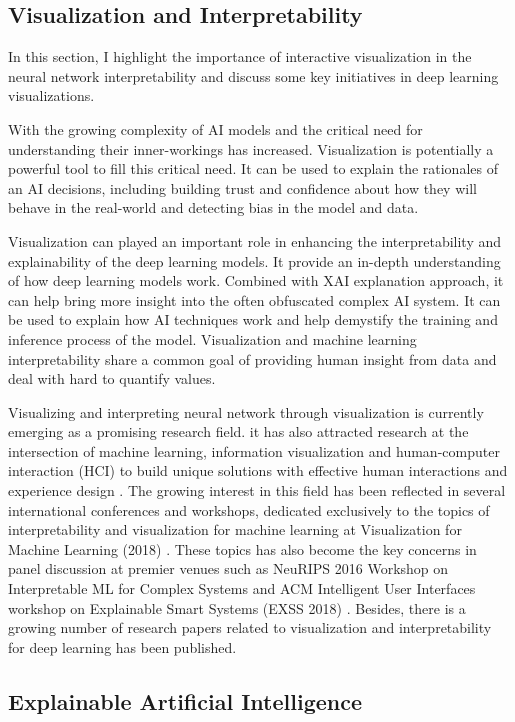 \subsection{Visualization and Interpretability}

In this section, I highlight the importance of interactive visualization in the neural network interpretability and discuss some key initiatives in deep learning visualizations. 

With the growing complexity of AI models and the critical need for understanding their inner-workings has increased. Visualization is potentially a powerful tool to fill this critical need. It can be used to explain the rationales of an AI decisions, including building trust and confidence about how they will behave in the real-world and detecting bias in the model and data.

Visualization can played an important role in enhancing the interpretability and explainability of the deep learning models. It provide an in-depth understanding of how deep learning models work. Combined with XAI explanation approach, it can help bring more insight into the often obfuscated complex AI system. It can be used to explain how AI techniques work and help demystify the training and inference process of the model.
Visualization and machine learning interpretability share a common goal of providing human insight from data and deal with hard to quantify values.

Visualizing and interpreting neural network through visualization is currently emerging as a promising research field. it has also attracted research at the intersection of machine learning, information visualization and human-computer interaction (HCI) to build unique solutions with effective human interactions and experience design \cite{Dudley2018}. The growing interest in this field has been reflected in several international conferences and workshops, dedicated exclusively to the topics of interpretability and visualization for machine learning at Visualization for Machine Learning (2018) \cite{visml2018}. These topics has also become the key concerns in panel discussion at premier venues such as NeuRIPS 2016 Workshop on Interpretable ML for Complex Systems \cite{imlcs2016}and ACM Intelligent User Interfaces workshop on Explainable Smart Systems (EXSS 2018) \cite{exss2018}. Besides, there is a growing number of research papers related to visualization and interpretability for deep learning has been published.

\subsection{Explainable Artificial Intelligence}

